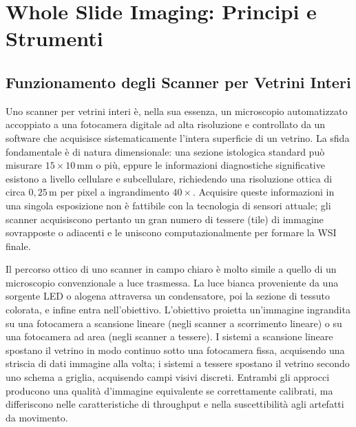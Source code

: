 \section{Whole Slide Imaging: Principi e Strumenti}

\subsection{Funzionamento degli Scanner per Vetrini Interi}

Uno scanner per vetrini interi è, nella sua essenza, un microscopio automatizzato accoppiato a una fotocamera digitale ad alta risoluzione e controllato da un software che acquisisce sistematicamente l'intera superficie di un vetrino. La sfida fondamentale è di natura dimensionale: una sezione istologica standard può misurare $15 \times 10$\,mm o più, eppure le informazioni diagnostiche significative esistono a livello cellulare e subcellulare, richiedendo una risoluzione ottica di circa $0{,}25$\,\textmu m per pixel a ingrandimento $40\times$. Acquisire queste informazioni in una singola esposizione non è fattibile con la tecnologia di sensori attuale; gli scanner acquisiscono pertanto un gran numero di tessere (tile) di immagine sovrapposte o adiacenti e le uniscono computazionalmente per formare la WSI finale.

Il percorso ottico di uno scanner in campo chiaro è molto simile a quello di un microscopio convenzionale a luce trasmessa. La luce bianca proveniente da una sorgente LED o alogena attraversa un condensatore, poi la sezione di tessuto colorata, e infine entra nell'obiettivo. L'obiettivo proietta un'immagine ingrandita su una fotocamera a scansione lineare (negli scanner a scorrimento lineare) o su una fotocamera ad area (negli scanner a tessere). I sistemi a scansione lineare spostano il vetrino in modo continuo sotto una fotocamera fissa, acquisendo una striscia di dati immagine alla volta; i sistemi a tessere spostano il vetrino secondo uno schema a griglia, acquisendo campi visivi discreti. Entrambi gli approcci producono una qualità d'immagine equivalente se correttamente calibrati, ma differiscono nelle caratteristiche di throughput e nella suscettibilità agli artefatti da movimento.

